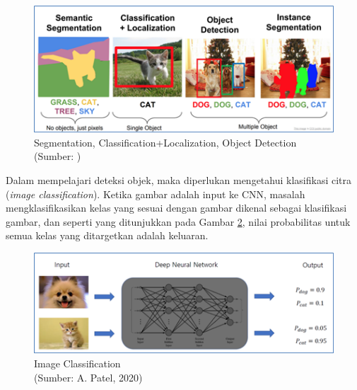 \begin{figure}[H]
	\vspace{-0.1cm}
	\begin{center}
		\includegraphics[width=1\columnwidth]{bab2/Gambar/Picture3.png}
	\end{center}
	\vspace{-0.2cm}
	\caption{Segmentation, Classification+Localization, Object Detection\\(Sumber: \cite{Patel_2020})}\label{img:Segementation-Classification}
\end{figure}

Dalam mempelajari deteksi objek, maka diperlukan mengetahui klasifikasi citra (\textit{image classification}). Ketika gambar adalah input ke CNN, masalah mengklasifikasikan kelas yang sesuai dengan gambar dikenal sebagai klasifikasi gambar, dan seperti yang ditunjukkan pada Gambar \ref{img:Image-Classification}, nilai probabilitas untuk semua kelas yang ditargetkan adalah keluaran.

\begin{figure}[H]
	\vspace{-0.1cm}
	\begin{center}
		\includegraphics[width=1\columnwidth]{bab2/Gambar/Picture4.png}
	\end{center}
	\vspace{-0.2cm}
	\caption{Image Classification\\(Sumber: A. Patel, 2020)}\label{img:Image-Classification}
\end{figure}

